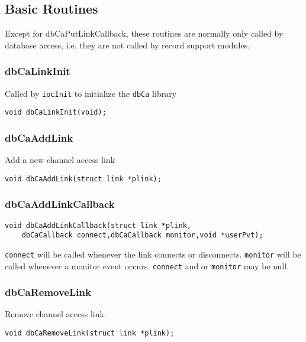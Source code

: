 \subsection{Basic Routines}

Except for dbCaPutLinkCallback, these routines are normally only called by database access, i.e. they are not called by record support modules.

\subsubsection{dbCaLinkInit}

Called by \verb|iocInit| to initialize the \verb|dbCa| library

\begin{verbatim}
void dbCaLinkInit(void);
\end{verbatim}

\subsubsection{dbCaAddLink}

Add a new channel access link

\begin{verbatim}
void dbCaAddLink(struct link *plink);
\end{verbatim}

\subsubsection{dbCaAddLinkCallback}

\begin{verbatim}
void dbCaAddLinkCallback(struct link *plink,
    dbCaCallback connect,dbCaCallback monitor,void *userPvt);
\end{verbatim}

\verb|connect| will be called whenever the link connects or disconnects.
\verb|monitor| will be called whenever a monitor event occurs.
\verb|connect| and or \verb|monitor| may be null.

\subsubsection{dbCaRemoveLink}

Remove channel access link.

\begin{verbatim}
void dbCaRemoveLink(struct link *plink);
\end{verbatim}

